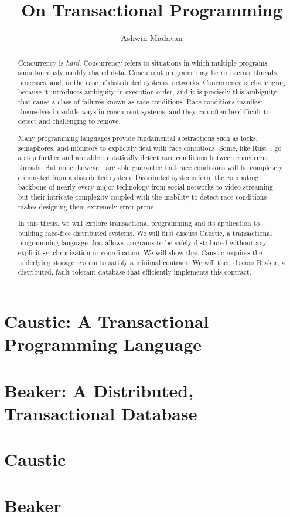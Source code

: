 \documentclass[12pt]{report}
\begin{document}
\title{On Transactional Programming}
\author{Ashwin Madavan}
\maketitle

\begin{abstract}
  Concurrency is \emph{hard}. Concurrency refers to situations in which multiple programs
  simultaneously modify shared data. Concurrent programs may be run across threads, processes,
  and, in the case of distributed systems, networks. Concurrency is challenging because it
  introduces ambiguity in execution order, and it is precisely this ambiguity that cause a class of
  failures known as race conditions. Race conditions manifest themselves in subtle ways in
  concurrent systems, and they can often be difficult to detect and challenging to remove.

  Many programming languages provide fundamental abstractions such as locks, semaphores, and
  monitors to explicitly deal with race conditions. Some, like Rust~\cite{rust}, go a step further
  and are able to statically detect race conditions between concurrent threads. But none, however,
  are able guarantee that race conditions will be completely eliminated from a distributed system.
  Distributed systems form the computing backbone of nearly every major technology from social
  networks to video streaming, but their intricate complexity coupled with the inability to detect
  race conditions makes designing them extremely error-prone.

  In this thesis, we will explore transactional programming and its application to building
  race-free distributed systems. We will first discuss Caustic, a transactional programming language
  that allows programs to be safely distributed without any explicit synchronization or
  coordination. We will show that Caustic requires the underlying storage system to satisfy a
  minimal contract. We will then discuss Beaker, a distributed, fault-tolerant database that
  efficiently implements this contract.
\end{abstract}

\tableofcontents

\chapter{Caustic: A Transactional Programming Language}


\chapter{Beaker: A Distributed, Transactional Database}


\appendix
\chapter{Caustic}


\chapter{Beaker}


\printbibliography
\end{document}
